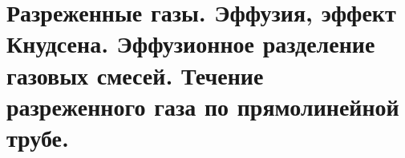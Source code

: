 \section{\normalsize Разреженные газы. Эффузия, эффект Кнудсена. Эффузионное разделение газовых смесей. Течение разреженного газа по прямолинейной трубе.}
